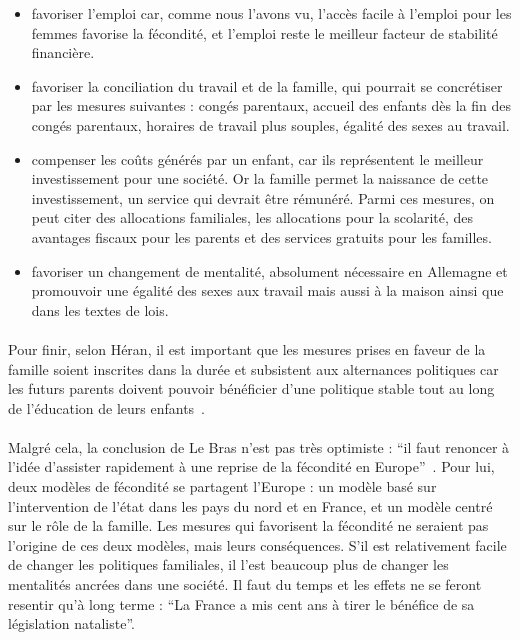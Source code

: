 \begin{itemize}
  \item favoriser l’emploi car, comme nous l’avons vu, l’accès facile à l'emploi pour les femmes favorise la fécondité, et l’emploi reste le meilleur facteur de stabilité financière.
  \item favoriser la conciliation du travail et de la famille, qui pourrait se concrétiser par les mesures suivantes : congés parentaux, accueil des enfants dès la fin des congés parentaux, horaires de travail plus souples, égalité des sexes au travail.
  \item compenser les coûts générés par un enfant, car ils représentent le meilleur investissement pour une société. Or la famille permet la naissance de cette investissement, un service qui devrait être rémunéré. Parmi ces mesures, on peut citer des allocations familiales, les allocations pour la scolarité, des avantages fiscaux pour les parents et des services gratuits pour les familles.
  \item favoriser un changement de mentalité, absolument nécessaire en Allemagne et promouvoir une égalité des sexes aux travail mais aussi à la maison ainsi que dans les textes de lois.  
\end{itemize}

\paragraph{}Pour finir, selon Héran, il est important que les mesures prises en faveur de la famille soient inscrites dans la durée et subsistent aux alternances politiques car les futurs parents doivent pouvoir bénéficier d’une politique stable tout au long de l'éducation de leurs enfants~\citep[pp.14]{heran}. 

\paragraph{}Malgré cela, la conclusion de Le Bras n’est pas très optimiste : “il faut renoncer à l’idée d’assister rapidement à une reprise de la fécondité en Europe”~\citep[pp.27]{heran}. Pour lui, deux modèles de fécondité se partagent l’Europe : un modèle basé sur l’intervention de l’état dans les pays du nord et en France, et un modèle centré sur le rôle de la famille. Les mesures qui favorisent la fécondité ne seraient pas l'origine de ces deux modèles, mais leurs conséquences. S’il est relativement facile de changer les politiques familiales, il l’est beaucoup plus de changer les mentalités ancrées dans une société. Il faut du temps et les effets ne se feront resentir qu'à long terme : “La France a mis cent ans à tirer le bénéfice de sa législation nataliste”\citep[pp.28]{heran}.

